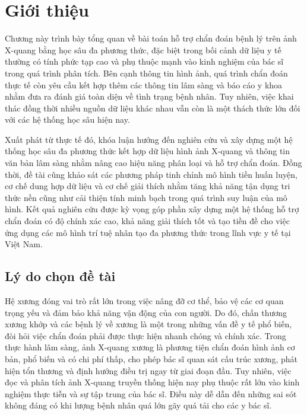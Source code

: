 \chapter{Giới thiệu}
Chương này trình bày tổng quan về bài toán hỗ trợ chẩn đoán bệnh lý trên ảnh X-quang bằng học sâu đa phương thức, đặc biệt trong bối cảnh dữ liệu y tế thường có tính phức tạp cao và phụ thuộc mạnh vào kinh nghiệm của bác sĩ trong quá trình phân tích. Bên cạnh thông tin hình ảnh, quá trình chẩn đoán thực tế còn yêu cầu kết hợp thêm các thông tin lâm sàng và báo cáo y khoa nhằm đưa ra đánh giá toàn diện về tình trạng bệnh nhân. Tuy nhiên, việc khai thác đồng thời nhiều nguồn dữ liệu khác nhau vẫn còn là một thách thức lớn đối với các hệ thống học sâu hiện nay.

Xuất phát từ thực tế đó, khóa luận hướng đến nghiên cứu và xây dựng một hệ thống học sâu đa phương thức kết hợp dữ liệu hình ảnh X-quang và thông tin văn bản lâm sàng nhằm nâng cao hiệu năng phân loại và hỗ trợ chẩn đoán. Đồng thời, đề tài cũng khảo sát các phương pháp tinh chỉnh mô hình tiền huấn luyện, cơ chế dung hợp dữ liệu và cơ chế giải thích nhằm tăng khả năng tận dụng tri thức nền cũng như cải thiện tính minh bạch trong quá trình suy luận của mô hình. Kết quả nghiên cứu được kỳ vọng góp phần xây dựng một hệ thống hỗ trợ chẩn đoán có độ chính xác cao, khả năng giải thích tốt và tạo tiền đề cho việc ứng dụng các mô hình trí tuệ nhân tạo đa phương thức trong lĩnh vực y tế tại Việt Nam.
\label{Chapter1}

\pagebreak

\section{Lý do chọn đề tài}
Hệ xương đóng vai trò rất lớn trong việc nâng đỡ cơ thể, bảo vệ các cơ quan trọng yếu và đảm bảo khả năng vận động của con người. Do đó, chấn thương xương khớp và các bệnh lý về xương là một trong những vấn đề y tế phổ biến, đòi hỏi việc chẩn đoán phải được thực hiện nhanh chóng và chính xác. Trong thực hành lâm sàng, ảnh X-quang xương là phương tiện chẩn đoán hình ảnh cơ bản, phổ biến và có chi phí thấp, cho phép bác sĩ quan sát cấu trúc xương, phát hiện tổn thương và định hướng điều trị ngay từ giai đoạn đầu. Tuy nhiên, việc đọc và phân tích ảnh X-quang truyền thống hiện nay phụ thuộc rất lớn vào kinh nghiệm thực tiễn và sự tập trung của bác sĩ. Điều này dễ dẫn đến những sai sót không đáng có khi lượng bệnh nhân quá lớn gãy quá tải cho các y bác sĩ. 

